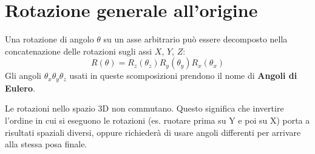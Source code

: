 %
\section{Rotazione generale all'origine}
Una rotazione di angolo $ \theta $ su un asse arbitrario può essere decomposto nella concatenazione delle rotazioni sugli assi $ X $, $ Y $, $ Z $:
\[
    R(\theta) = R_z(\theta_z) R_y(\theta_y) R_x(\theta_x)
\]
Gli angoli $\theta_x \theta_y \theta_z$ usati in queste scomposizioni prendono il nome di \textbf{Angoli di Eulero}.

\begin{note}
    Le rotazioni nello spazio 3D non commutano. Questo significa che invertire l'ordine in cui si eseguono le rotazioni (es. ruotare prima su Y e poi su X) porta a risultati spaziali diversi, oppure richiederà di usare angoli differenti per arrivare alla stessa posa finale.
\end{note}